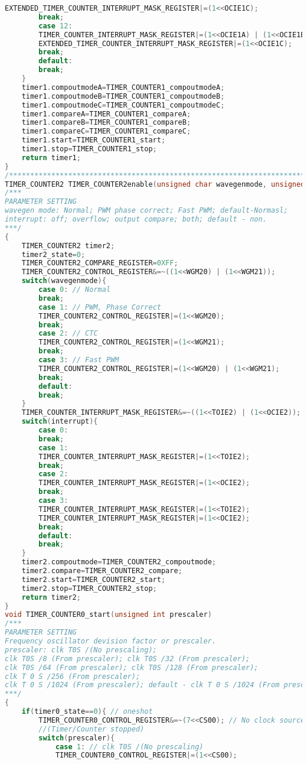 \begin{lstlisting}[language=C, caption={atmega128timer.c}, label=atmega128timer-c, captionpos=b]
		EXTENDED_TIMER_COUNTER_INTERRUPT_MASK_REGISTER|=(1<<OCIE1C);
		break;
		case 12:
		TIMER_COUNTER_INTERRUPT_MASK_REGISTER|=(1<<OCIE1A) | (1<<OCIE1B);
		EXTENDED_TIMER_COUNTER_INTERRUPT_MASK_REGISTER|=(1<<OCIE1C);
		break;
		default:
		break;
	}
	timer1.compoutmodeA=TIMER_COUNTER1_compoutmodeA;
	timer1.compoutmodeB=TIMER_COUNTER1_compoutmodeB;
	timer1.compoutmodeC=TIMER_COUNTER1_compoutmodeC;
	timer1.compareA=TIMER_COUNTER1_compareA;
	timer1.compareB=TIMER_COUNTER1_compareB;
	timer1.compareC=TIMER_COUNTER1_compareC;
	timer1.start=TIMER_COUNTER1_start;
	timer1.stop=TIMER_COUNTER1_stop;
	return timer1;
}
/*****************************************************************************************/
TIMER_COUNTER2 TIMER_COUNTER2enable(unsigned char wavegenmode, unsigned char interrupt)
/***
PARAMETER SETTING
wavegen mode: Normal; PWM phase correct; Fast PWM; default-Normasl;
interrupt: off; overflow; output compare; both; default - non.
***/
{
	TIMER_COUNTER2 timer2;
	timer2_state=0;
	TIMER_COUNTER2_COMPARE_REGISTER=0XFF;
	TIMER_COUNTER2_CONTROL_REGISTER&=~((1<<WGM20) | (1<<WGM21));
	switch(wavegenmode){
		case 0: // Normal
		break;
		case 1: // PWM, Phase Correct
		TIMER_COUNTER2_CONTROL_REGISTER|=(1<<WGM20);
		break;
		case 2: // CTC
		TIMER_COUNTER2_CONTROL_REGISTER|=(1<<WGM21);
		break;
		case 3: // Fast PWM
		TIMER_COUNTER2_CONTROL_REGISTER|=(1<<WGM20) | (1<<WGM21);
		break;
		default:
		break;
	}
	TIMER_COUNTER_INTERRUPT_MASK_REGISTER&=~((1<<TOIE2) | (1<<OCIE2));
	switch(interrupt){
		case 0: 
		break;
		case 1:
		TIMER_COUNTER_INTERRUPT_MASK_REGISTER|=(1<<TOIE2);
		break;
		case 2:
		TIMER_COUNTER_INTERRUPT_MASK_REGISTER|=(1<<OCIE2);
		break;
		case 3:
		TIMER_COUNTER_INTERRUPT_MASK_REGISTER|=(1<<TOIE2);
		TIMER_COUNTER_INTERRUPT_MASK_REGISTER|=(1<<OCIE2);
		break;
		default:
		break;
	}
	timer2.compoutmode=TIMER_COUNTER2_compoutmode;
	timer2.compare=TIMER_COUNTER2_compare;
	timer2.start=TIMER_COUNTER2_start;
	timer2.stop=TIMER_COUNTER2_stop;
	return timer2;
}
void TIMER_COUNTER0_start(unsigned int prescaler)
/***
PARAMETER SETTING
Frequency oscillator devision factor or prescaler.
prescaler: clk T0S /(No prescaling);
clk T0S /8 (From prescaler); clk T0S /32 (From prescaler);
clk T0S /64 (From prescaler); clk T0S /128 (From prescaler);
clk T 0 S /256 (From prescaler);
clk T 0 S /1024 (From prescaler); default - clk T 0 S /1024 (From prescaler).
***/
{
	if(timer0_state==0){ // oneshot
		TIMER_COUNTER0_CONTROL_REGISTER&=~(7<<CS00); // No clock source.
		//(Timer/Counter stopped)
		switch(prescaler){
			case 1: // clk T0S /(No prescaling)
			TIMER_COUNTER0_CONTROL_REGISTER|=(1<<CS00);

\end{lstlisting}
